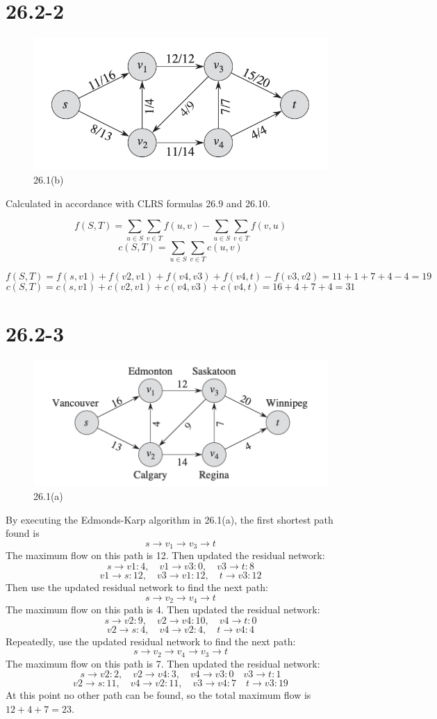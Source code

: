 \documentclass[12pt]{article}
\begin{document}
\section{26.2-2}
\begin{figure}[h]
    \centering
    \includegraphics[width=0.5\linewidth]{截屏2024-11-18 下午8.46.37.png}
    \caption{26.1(b)}
    \label{fig:enter-label}

\end{figure}
Calculated in accordance with CLRS formulas 26.9 and 26.10.

\[f(S, T) = \sum_{u \in S} \sum_{v \in T} f(u, v) - \sum_{u \in S} \sum_{v \in T} f(v, u)\]
\[c(S, T) = \sum_{u \in S} \sum_{v \in T} c(u, v)\]

\[f(S, T) = f(s,v1)+f(v2,v1)+f(v4,v3)+f(v4,t) - f(v3,v2) = 11+1+7+4-4=19\]
\[c(S, T) = c(s,v1)+c(v2,v1)+c(v4,v3)+c(v4,t)=16+4+7+4=31\]
\section{26.2-3}
\begin{figure}[h]
    \centering
    \includegraphics[width=0.5\linewidth]{截屏2024-11-18 下午8.43.56.png}
    \caption{26.1(a)}
    \label{fig:26.1(a)}
\end{figure}
By executing the Edmonds-Karp algorithm in 26.1(a), the first shortest path found is 
\[s \rightarrow v_1 \rightarrow v_3 \rightarrow t\]
The maximum flow on this path is 12.
Then updated the residual network:
\[s \rightarrow v1: 4, \quad v1 \rightarrow v3: 0, \quad v3 \rightarrow t: 8\]
\[v1 \rightarrow s: 12, \quad v3 \rightarrow v1: 12, \quad t \rightarrow v3: 12\]
Then use the updated residual network to find the next path:
\[s  \rightarrow v_2 \rightarrow v_4 \rightarrow t\]
The maximum flow on this path is 4.
Then updated the residual network:
\[s \rightarrow v2: 9, \quad v2 \rightarrow v4: 10, \quad v4 \rightarrow t: 0 \]
\[v2 \rightarrow s: 4, \quad v4 \rightarrow v2: 4, \quad t \rightarrow v4: 4 \]
Repeatedly, use the updated residual network to find the next path:
\[s \rightarrow v_2 \rightarrow v_4  \rightarrow v_3 \rightarrow t\]
The maximum flow on this path is 7.
Then updated the residual network:
\[s \rightarrow v2: 2, \quad v2 \rightarrow v4: 3, \quad v4 \rightarrow v3: 0 \quad v3 \rightarrow t: 1\]
\[v2 \rightarrow s: 11, \quad v4 \rightarrow v2: 11, \quad v3 \rightarrow v4: 7 \quad t \rightarrow v3: 19\]
At this point no other path can be found, so the total maximum flow is \(12+4+7=23\).
\end{document}
